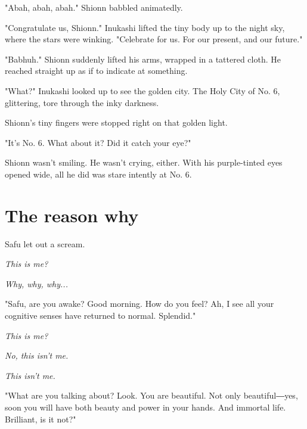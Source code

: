 "Abah, abah, abah." Shionn babbled animatedly.

"Congratulate us, Shionn." Inukashi lifted the tiny body up to the night
sky, where the stars were winking. "Celebrate for us. For our present,
and our future."

"Babhuh." Shionn suddenly lifted his arms, wrapped in a tattered cloth.
He reached straight up as if to indicate at something.

"What?" Inukashi looked up to see the golden city. The Holy City of No.
6, glittering, tore through the inky darkness.

Shionn's tiny fingers were stopped right on that golden light.

"It's No. 6. What about it? Did it catch your eye?"

Shionn wasn't smiling. He wasn't crying, either. With his purple-tinted
eyes opened wide, all he did was stare intently at No. 6.

\chapter{The reason why}


Safu let out a scream.

\emph{This is me?}

\emph{Why, why, why...}

"Safu, are you awake? Good morning. How do you feel? Ah, I see all your
cognitive senses have returned to normal. Splendid."

\emph{This is me?}

\emph{No, this isn't me.}

\emph{This isn't me.}

"What are you talking about? Look. You are beautiful. Not only
beautiful―yes, soon you will have both beauty and power in your hands.
And immortal life. Brilliant, is it not?"

